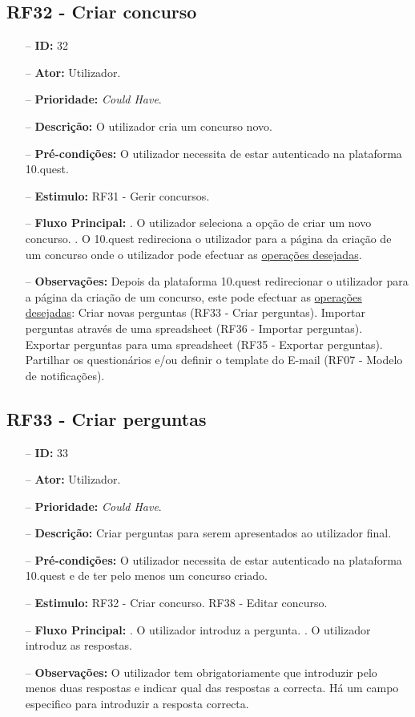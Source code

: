 \subsection{RF32 - Criar concurso}
\begin{itemize}
	\item[--] \textbf{ID:} 32
	\item[--]  \textbf{Ator:} Utilizador.
	\item[--]  \textbf{Prioridade:} \textit{Could Have}.
	\item[--]  \textbf{Descrição:} O utilizador cria um concurso novo.
	\item[--]  \textbf{Pré-condições:} O utilizador necessita de estar autenticado na plataforma 10.quest.
	\item[--]  \textbf{Estimulo:} RF31 - Gerir concursos.
	\item[--]  \textbf{Fluxo Principal:} 
	. O utilizador seleciona a opção de criar um novo concurso.
	. O 10.quest redireciona o utilizador para a página da criação de um concurso onde o utilizador pode efectuar as \underline{operações desejadas}.
	\item[--]  \textbf{Observações:} Depois da plataforma 10.quest redirecionar o utilizador para a página da criação de um concurso, este pode efectuar as \underline{operações desejadas}:
	\subitem Criar novas perguntas (RF33 - Criar perguntas).
	\subitem Importar perguntas através de uma spreadsheet (RF36 - Importar perguntas).
	\subitem Exportar perguntas para uma spreadsheet (RF35 - Exportar perguntas).
	\subitem Partilhar os questionários e/ou definir o template do E-mail (RF07 - Modelo de notificações).
\end{itemize}
\newpage

\subsection{RF33 - Criar perguntas}
\begin{itemize}
	\item[--] \textbf{ID:} 33
	\item[--]  \textbf{Ator:} Utilizador.
	\item[--]  \textbf{Prioridade:} \textit{Could Have}.
	\item[--]  \textbf{Descrição:} Criar perguntas para serem apresentados ao utilizador final.
	\item[--]  \textbf{Pré-condições:} O utilizador necessita de estar autenticado na plataforma 10.quest e de ter pelo menos um concurso criado.
	\item[--]  \textbf{Estimulo:}  
	\subitem RF32 - Criar concurso.
	\subitem RF38 - Editar concurso.
	\item[--]  \textbf{Fluxo Principal:} 
	. O utilizador introduz a pergunta.
	. O utilizador introduz as respostas.
	\item[--]  \textbf{Observações:} O utilizador tem obrigatoriamente que introduzir pelo menos duas respostas e indicar qual das respostas a correcta. Há um campo especifico para introduzir a resposta correcta.
\end{itemize}
\newpage

